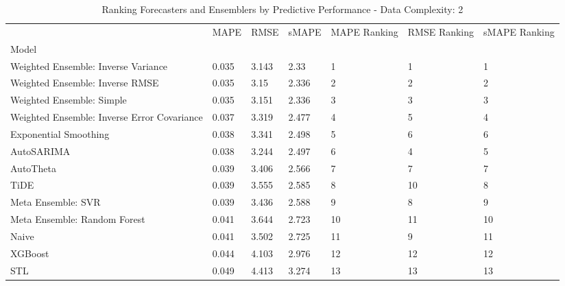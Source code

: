 \begin{table}
\caption{Ranking Forecasters and Ensemblers by Predictive Performance - Data Complexity: 2}
\begin{tabular}{lllllll}
\toprule
 & MAPE & RMSE & sMAPE & MAPE Ranking & RMSE Ranking & sMAPE Ranking \\
Model &  &  &  &  &  &  \\
\midrule
Weighted Ensemble: Inverse Variance & 0.035 & 3.143 & 2.33 & 1 & 1 & 1 \\
Weighted Ensemble: Inverse RMSE & 0.035 & 3.15 & 2.336 & 2 & 2 & 2 \\
Weighted Ensemble: Simple & 0.035 & 3.151 & 2.336 & 3 & 3 & 3 \\
Weighted Ensemble: Inverse Error Covariance & 0.037 & 3.319 & 2.477 & 4 & 5 & 4 \\
Exponential Smoothing & 0.038 & 3.341 & 2.498 & 5 & 6 & 6 \\
AutoSARIMA & 0.038 & 3.244 & 2.497 & 6 & 4 & 5 \\
AutoTheta & 0.039 & 3.406 & 2.566 & 7 & 7 & 7 \\
TiDE & 0.039 & 3.555 & 2.585 & 8 & 10 & 8 \\
Meta Ensemble: SVR & 0.039 & 3.436 & 2.588 & 9 & 8 & 9 \\
Meta Ensemble: Random Forest & 0.041 & 3.644 & 2.723 & 10 & 11 & 10 \\
Naive & 0.041 & 3.502 & 2.725 & 11 & 9 & 11 \\
XGBoost & 0.044 & 4.103 & 2.976 & 12 & 12 & 12 \\
STL & 0.049 & 4.413 & 3.274 & 13 & 13 & 13 \\
\bottomrule
\end{tabular}
\end{table}
